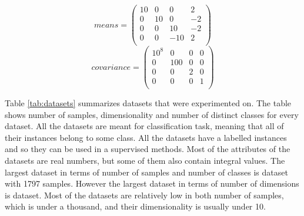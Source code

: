 \documentclass[12pt,a4paper]{report}
\begin{document}
\begin{equation} \label{eq:gauss:means}
means = \begin{pmatrix}
10 & 0 & 0 & 2 \\
0 & 10 & 0 & -2 \\
0 & 0 & 10 & -2 \\
0 & 0 & -10 & 2 \\
\end{pmatrix}
\end{equation}
\begin{equation} \label{eq:gauss:cov}
covariance = \begin{pmatrix}
10^8 & 0 & 0 & 0 \\
0 & 100 & 0 & 0 \\
0 & 0 & 2 & 0 \\
0 & 0 & 0 & 1 \\
\end{pmatrix}
\end{equation}

Table \ref{tab:datasets} summarizes datasets that were experimented on. The table shows number of samples, dimensionality and number of distinct classes for every dataset. All the datasets are meant for classification task, meaning that all of their instances belong to some class. All the datasets have a labelled instances and so they can be used in a supervised methods. Most of the attributes of the datasets are real numbers, but some of them also contain integral values. The largest dataset in terms of number of samples and number of classes is  dataset with 1797 samples. However the largest dataset in terms of number of dimensions is  dataset. Most of the datasets are relatively low in both number of samples, which is under a thousand, and their dimensionality is usually under 10.
\end{document}
